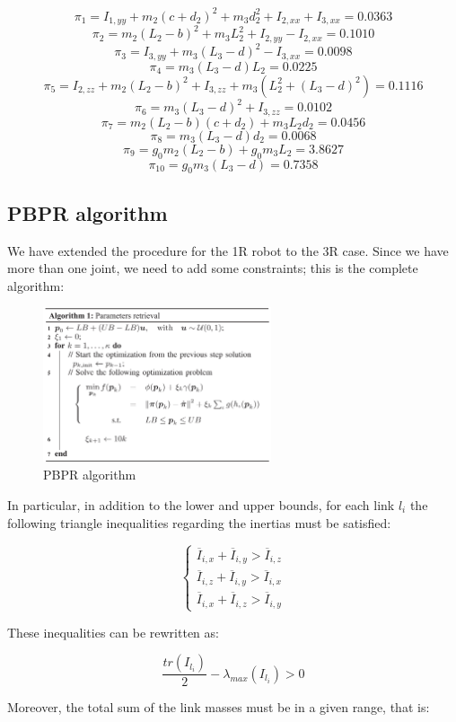 \documentclass{article}
\begin{document}
\[\pi_1= I_{1,yy} + m_2 (c+ d_2)^2 + m_3 d_2^2 + I_{2,xx} + I_{3,xx} = 0.0363\]
\[\pi_2 = m_2(L_2 -b)^2 + m_3 L_2^2 + I_{2,yy} - I_{2,xx} = 0.1010\]
\[\pi_3 = I_{3,yy} + m_3(L_3 - d)^2 - I_{3,xx} = 0.0098\]
\[\pi_4 = m_3(L_3 -d)L_2 = 0.0225\]
\[\pi_5 = I_{2,zz} + m_2(L_2 - b)^2 + I_{3,zz} + m_3(L_2^2 + (L_3 - d)^2 ) = 0.1116\]
\[\pi_6 = m_3(L_3 -d)^2 + I_{3,zz} = 0.0102\]
\[\pi_7 = m_2(L_2 - b)(c+ d_2) + m_3 L_2 d_2 = 0.0456\]
\[\pi_8 = m_3(L_3 - d)d_2 = 0.0068\]
\[\pi_9 = g_0 m_2 (L_2 - b) + g_0 m_3 L_2 = 3.8627\]
\[\pi_{10} = g_0 m_3 (L_3 - d) = 0.7358\]

\subsection{PBPR algorithm}
We have extended the procedure for the 1R robot to the 3R case. Since we have more than one joint, we need to add some constraints; this is the complete algorithm:
\FloatBarrier
\begin{figure}[!htbp]
\centering
\includegraphics[width=0.6\textwidth]{images/3-dof/algorithm.png}
\caption{PBPR algorithm}
\end{figure}
\FloatBarrier
In particular, in addition to the lower and upper bounds, for each link $l_i$ the following triangle inequalities regarding the inertias must be satisfied:

\[\begin{cases}
\overline{I}_{i,x}+\overline{I}_{i,y} > \overline{I}_{i,z} \\
\overline{I}_{i,z}+\overline{I}_{i,y} > \overline{I}_{i,x} \\
\overline{I}_{i,x}+\overline{I}_{i,z} > \overline{I}_{i,y}
\end{cases}\]

\noindent These inequalities can be rewritten as:

\[\frac{tr(I_{l_i})}{2}-\lambda_{max}(I_{l_i})>0\]

\noindent Moreover, the total sum of the link masses must be in a given range, that is:
\end{document}
